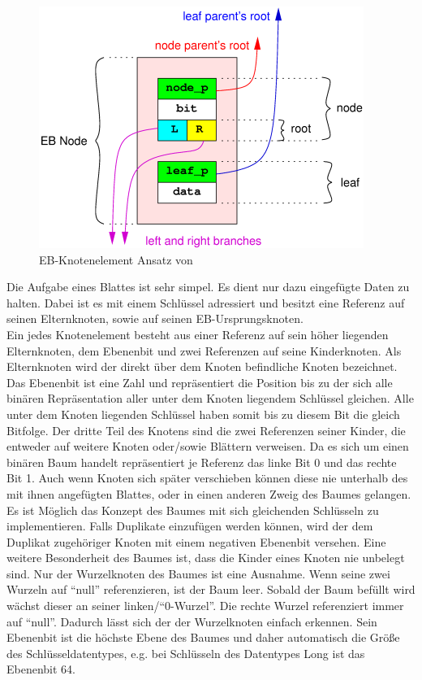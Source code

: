 \documentclass[a4paper,11pt,oneside,%
headsepline,												%
footsepline,												%
bibtotocnumbered									%
]{scrreprt}
\begin{document}
\begin{figure}[h!]
  \begin{center}
    \includegraphics[width=.5\linewidth]{bilder/Ebnode.png}
  \end{center}
 \caption{EB-Knotenelement Ansatz von \autocite{Tarreau}}
\end{figure}
Die Aufgabe eines Blattes ist sehr simpel. Es dient nur dazu eingefügte Daten zu halten. Dabei ist es mit einem Schlüssel adressiert und besitzt eine Referenz auf seinen Elternknoten, sowie auf seinen EB-Ursprungsknoten.\\

Ein jedes Knotenelement besteht aus einer Referenz auf sein höher liegenden Elternknoten, dem Ebenenbit  und zwei Referenzen auf seine Kinderknoten. 
Als Elternknoten wird der direkt über dem Knoten befindliche Knoten bezeichnet. Das Ebenenbit ist eine Zahl und repräsentiert die Position bis zu der sich alle binären Repräsentation aller unter dem Knoten liegendem Schlüssel gleichen.  Alle unter dem Knoten liegenden Schlüssel haben somit bis zu diesem Bit die gleich Bitfolge. Der dritte Teil des Knotens sind die zwei Referenzen seiner Kinder, die entweder auf weitere Knoten oder/sowie Blättern verweisen. Da es sich um einen binären Baum handelt repräsentiert je Referenz das linke Bit 0 und das rechte Bit 1. Auch wenn Knoten sich später verschieben können diese nie unterhalb des mit ihnen angefügten Blattes, oder in einen anderen Zweig des Baumes gelangen. Es ist Möglich das Konzept des Baumes mit sich gleichenden Schlüsseln zu implementieren. Falls Duplikate einzufügen werden können, wird der dem Duplikat zugehöriger Knoten mit einem negativen Ebenenbit versehen. Eine weitere Besonderheit des Baumes ist, dass die Kinder eines Knoten nie unbelegt sind. Nur der Wurzelknoten des Baumes ist eine Ausnahme. Wenn seine zwei Wurzeln auf \enquote{null} referenzieren, ist der Baum leer. Sobald der Baum befüllt wird wächst dieser an seiner linken/\enquote{0-Wurzel}. Die rechte Wurzel referenziert immer auf \enquote{null}. Dadurch lässt sich der der Wurzelknoten einfach erkennen.
Sein Ebenenbit ist die höchste Ebene des Baumes und daher automatisch die Größe des Schlüsseldatentypes, e.g. bei Schlüsseln des Datentypes Long ist das Ebenenbit 64.\\
\end{document}
